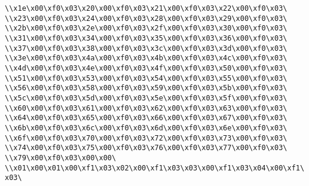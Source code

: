 \verb|\\x1e\x00\xf0\x03\x20\x00\xf0\x03\x21\x00\xf0\x03\x22\x00\xf0\x03\|\newline
\verb|\\x23\x00\xf0\x03\x24\x00\xf0\x03\x28\x00\xf0\x03\x29\x00\xf0\x03\|\newline
\verb|\\x2b\x00\xf0\x03\x2e\x00\xf0\x03\x2f\x00\xf0\x03\x30\x00\xf0\x03\|\newline
\verb|\\x31\x00\xf0\x03\x34\x00\xf0\x03\x35\x00\xf0\x03\x36\x00\xf0\x03\|\newline
\verb|\\x37\x00\xf0\x03\x38\x00\xf0\x03\x3c\x00\xf0\x03\x3d\x00\xf0\x03\|\newline
\verb|\\x3e\x00\xf0\x03\x4a\x00\xf0\x03\x4b\x00\xf0\x03\x4c\x00\xf0\x03\|\newline
\verb|\\x4d\x00\xf0\x03\x4e\x00\xf0\x03\x4f\x00\xf0\x03\x50\x00\xf0\x03\|\newline
\verb|\\x51\x00\xf0\x03\x53\x00\xf0\x03\x54\x00\xf0\x03\x55\x00\xf0\x03\|\newline
\verb|\\x56\x00\xf0\x03\x58\x00\xf0\x03\x59\x00\xf0\x03\x5b\x00\xf0\x03\|\newline
\verb|\\x5c\x00\xf0\x03\x5d\x00\xf0\x03\x5e\x00\xf0\x03\x5f\x00\xf0\x03\|\newline
\verb|\\x60\x00\xf0\x03\x61\x00\xf0\x03\x62\x00\xf0\x03\x63\x00\xf0\x03\|\newline
\verb|\\x64\x00\xf0\x03\x65\x00\xf0\x03\x66\x00\xf0\x03\x67\x00\xf0\x03\|\newline
\verb|\\x6b\x00\xf0\x03\x6c\x00\xf0\x03\x6d\x00\xf0\x03\x6e\x00\xf0\x03\|\newline
\verb|\\x6f\x00\xf0\x03\x70\x00\xf0\x03\x72\x00\xf0\x03\x73\x00\xf0\x03\|\newline
\verb|\\x74\x00\xf0\x03\x75\x00\xf0\x03\x76\x00\xf0\x03\x77\x00\xf0\x03\|\newline
\verb|\\x79\x00\xf0\x03\x00\x00\|\newline
\verb|\\x01\x00\x01\x00\xf1\x03\x02\x00\xf1\x03\x03\x00\xf1\x03\x04\x00\xf1\x03\|\newline
